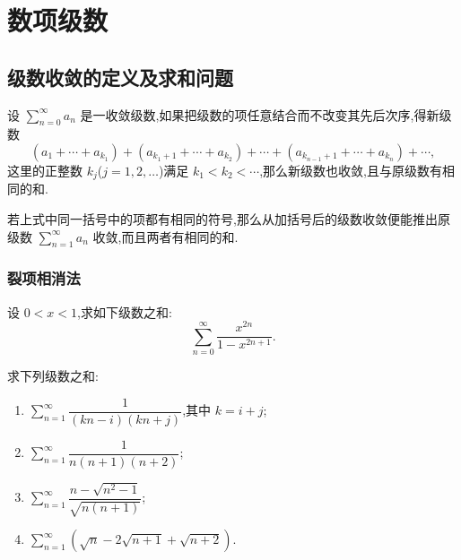 \documentclass[../数学分析培优讲义.tex]{subfiles}
\begin{document}
\setcounter{chapter}{7}
\pagestyle{fancy}

\chapter{数项级数}


\section{级数收敛的定义及求和问题}

\begin{theorem}
设 $\displaystyle\sum\limits_{n=0}^{\infty}a_n$ 是一收敛级数,如果把级数的项任意结合而不改变其先后次序,得新级数
\[
(a_1+\cdots+a_{k_1})+(a_{k_1+1}+\cdots+a_{k_2})+\cdots
+(a_{k_{n-1}+1}+\cdots+a_{k_n})+\cdots,
\]
这里的正整数 $k_j$($j=1,2,\ldots$)满足 $k_1<k_2<\cdots$,那么新级数也收敛,且与原级数有相同的和.
\end{theorem}

\begin{theorem}[\markstar]
若上式中同一括号中的项都有相同的符号,那么从加括号后的级数收敛便能推出原级数 $\displaystyle\sum\limits_{n=1}^{\infty}a_n$ 收敛,而且两者有相同的和.
\end{theorem}


\newpage

\subsection{裂项相消法}

\begin{example}
设 $0<x<1$,求如下级数之和:
\[
    \sum\limits_{n=0}^{\infty}\dfrac{x^{2n}}{1-x^{2n+1}}.
\]
\end{example}
\exampleblank

\begin{example}
求下列级数之和:
\begin{enumerate}[label=(\arabic*)]
    \item $\displaystyle\sum\limits_{n=1}^{\infty}\dfrac{1}{(kn-i)(kn+j)}$,其中 $k=i+j$;
    \item $\displaystyle\sum\limits_{n=1}^{\infty}\dfrac{1}{n(n+1)(n+2)}$;
    \item $\displaystyle\sum\limits_{n=1}^{\infty}\dfrac{n-\sqrt{n^2-1}}{\sqrt{n(n+1)}}$;
    \item $\displaystyle\sum\limits_{n=1}^{\infty}(\sqrt{n}-2\sqrt{n+1}+\sqrt{n+2})$.
\end{enumerate}
\end{example}
\exampleblank
\end{document}
